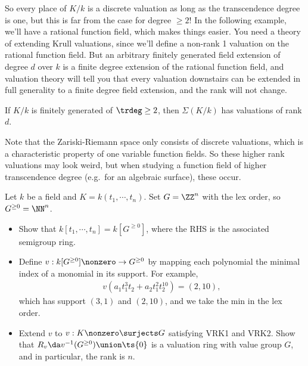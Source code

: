So every place of \(K/k\) is a discrete valuation as long as the
transcendence degree is one, but this is far from the case for degree
\(\geq 2\)! In the following example, we'll have a rational function
field, which makes things easier. You need a theory of extending Krull
valuations, since we'll define a non-rank 1 valuation on the rational
function field. But an arbitrary finitely generated field extension of
degree \(d\) over \(k\) is a finite degree extension of the rational
function field, and valuation theory will tell you that every valuation
downstairs can be extended in full generality to a finite degree field
extension, and the rank will not change.

\begin{exercise}[?]

If \(K/k\) is finitely generated of \(\trdeg \geq 2\), then
\(\Sigma(K/k)\) has valuations of rank \(d\).

\end{exercise}

Note that the Zariski-Riemann space only consists of discrete
valuations, which is a characteristic property of one variable function
fields. So these higher rank valuations may look weird, but when
studying a function field of higher transcendence degree (e.g.~for an
algebraic surface), these occur.

\begin{exercise}

Let \(k\) be a field and \(K = k(t_1, \cdots, t_n)\). Set \(G = \ZZ^n\)
with the lex order, so \(G^{\geq 0} = \NN^n\).

\begin{itemize}
\item
  Show that \(k[t_1, \cdots, t_n] = k[G^{\geq 0}]\), where the RHS is
  the associated semigroup ring.
\item
  Define \(v: k[G^{\geq 0}]\nonzero \to G^{\geq 0}\) by mapping each
  polynomial the minimal index of a monomial in its support. For
  example,
  \begin{align*}  
  v(a_1 t_1^3 t_2 + a_2 t_1^2 t_2^{10})  = (2, 10)
  ,\end{align*} which has support \((3, 1)\) and \((2, 10)\), and we
  take the min in the lex order.
\item
  Extend \(v\) to \(v: K\nonzero \surjects G\) satisfying VRK1 and VRK2.
  Show that \(R_v \da v^{-1}(G^{\geq 0}) \union\ts{0}\) is a valuation
  ring with value group \(G\), and in particular, the rank is \(n\).
\end{itemize}

\end{exercise}

